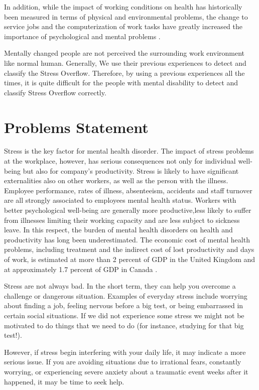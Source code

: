 In addition, while the impact of working conditions on health has historically been measured in terms of physical and environmental problems, the change to service jobs and the computerization of work tasks have greatly increased the importance of psychological and mental problems \citep{Cappelli1997ChangeWork}\citep{Robone2008ContractualSurvey}.

Mentally changed people are not perceived the surrounding work environment like normal human. Generally, We use their previous experiences to detect and classify the Stress Overflow. Therefore, by using a previous experiences all the times, it is quite difficult for the people with mental disability to detect and classify Stress Overflow correctly.

\section{Problems Statement }

Stress is the key factor for mental health disorder. The impact of stress problems at the workplace, however, has serious consequences not only for individual well-being but also for company's productivity. Stress is likely to have significant externalities also on other workers, as well as the person with the illness. Employee performance, rates of illness, absenteeism, accidents and staff turnover are all strongly associated to employees mental health status. Workers with better psychological well-being are generally more productive,less likely to suffer from illnesses limiting their working capacity and are less subject to sickness leave. 
In this respect, the burden of mental health disorders on health and productivity has long been underestimated. The economic cost of mental health problems, including treatment and the indirect cost of lost productivity and days of work, is estimated at more than 2 percent of GDP in the United Kingdom \citep{Cooper2005Happiness:Science} and at approximately 1.7 percent of GDP in Canada \citep{stephens}.

Stress are not always bad. In the short term, they can help you overcome a challenge or dangerous situation. Examples of everyday stress include worrying about finding a job, feeling nervous before a big test, or being embarrassed in certain social situations. If we did not experience some stress we might not be motivated to do things that we need to do (for instance, studying for that big test!).

However, if stress begin interfering with your daily life, it may indicate a more serious issue. If you are avoiding situations due to irrational fears, constantly worrying, or experiencing severe anxiety about a traumatic event weeks after it happened, it may be time to seek help.

